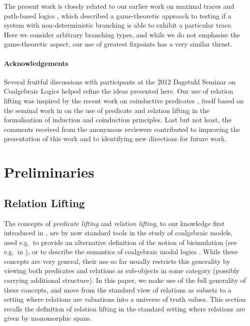 \documentclass[submission,copyright,creativecommons]{eptcs}
\theoremstyle{plain}\newtheorem{theorem}{Theorem}[section]
\theoremstyle{remark}
\begin{document}
The present work is closely related to our earlier work on maximal traces and path-based logics \cite{cirstea-11}, which described a game-theoretic approach to testing if a system with non-deterministic branching is able to exhibit a particular trace. Here we consider arbitrary branching types, and while we do not emphasise the game-theoretic aspect, our use of greatest fixpoints has a very similar thrust.

\paragraph{Acknowledgements} Several fruitful discussions with participants at the 2012 Dagstuhl Seminar on Coalgebraic Logics helped refine the ideas presented here. Our use of relation lifting was inspired by the recent work on coinductive predicates \cite{Hasuo12}, itself based on the seminal work in \cite{HermidaJ98} on the use of predicate and relation lifting in the formalisation of induction and coinduction principles. Last but not least, the comments received from the anonymous reviewers contributed to improving the presentation of this work and to identifying new directions for future work.

\section{Preliminaries}

\subsection{Relation Lifting}
\label{rel-lifting}
The concepts of \emph{predicate lifting} and \emph{relation lifting}, to our knowledge first introduced in \cite{HermidaJ98}, are by now standard tools in the study of coalgebraic models, used e.g.~to provide an alternative definition of the notion of bisimulation (see e.g.~in \cite{JacobsBook}), or to describe the semantics of coalgebraic modal logics \cite{Pattinson03,Moss99}. While these concepts are very general, their use so far usually restricts this generality by viewing both predicates and relations as sub-objects in some category (possibly carrying additional structure). In this paper, we make use of the full generality of these concepts, and move from the standard view of relations as subsets to a setting where relations are valuations into a universe of truth values. This section recalls the definition of relation lifting in the standard setting where relations are given by monomorphic spans.
\end{document}
